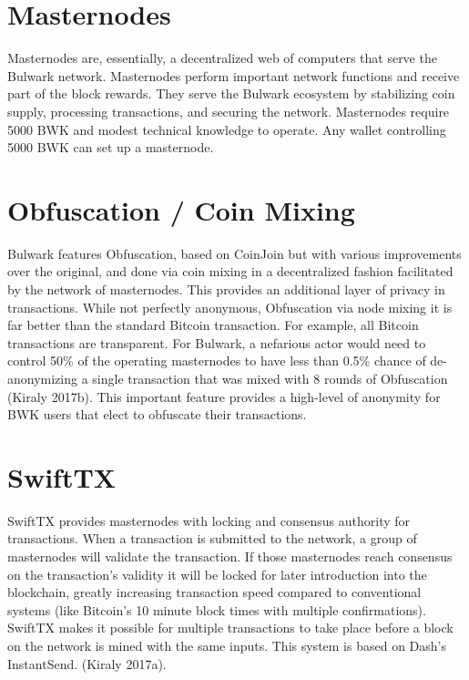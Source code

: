 \documentclass[11pt,a4paperpaper,]{report}
\begin{document}
\section{Masternodes}\label{masternodes}

Masternodes are, essentially, a decentralized web of computers that
serve the Bulwark network. Masternodes perform important network
functions and receive part of the block rewards. They serve the Bulwark
ecosystem by stabilizing coin supply, processing transactions, and
securing the network. Masternodes require 5000 BWK and modest technical
knowledge to operate. Any wallet controlling 5000 BWK can set up a
masternode.

\section{Obfuscation / Coin Mixing}\label{obfuscation-coin-mixing}

Bulwark features Obfuscation, based on CoinJoin but with various
improvements over the original, and done via coin mixing in a
decentralized fashion facilitated by the network of masternodes. This
provides an additional layer of privacy in transactions. While not
perfectly anonymous, Obfuscation via node mixing it is far better than
the standard Bitcoin transaction. For example, all Bitcoin transactions
are transparent. For Bulwark, a nefarious actor would need to control
50\% of the operating masternodes to have less than 0.5\% chance of
de-anonymizing a single transaction that was mixed with 8 rounds of
Obfuscation (Kiraly 2017b). This important feature provides a high-level
of anonymity for BWK users that elect to obfuscate their transactions.

\section{SwiftTX}\label{swifttx}

SwiftTX provides masternodes with locking and consensus authority for
transactions. When a transaction is submitted to the network, a group of
masternodes will validate the transaction. If those masternodes reach
consensus on the transaction's validity it will be locked for later
introduction into the blockchain, greatly increasing transaction speed
compared to conventional systems (like Bitcoin's 10 minute block times
with multiple confirmations). SwiftTX makes it possible for multiple
transactions to take place before a block on the network is mined with
the same inputs. This system is based on Dash's InstantSend. (Kiraly
2017a).
\end{document}
